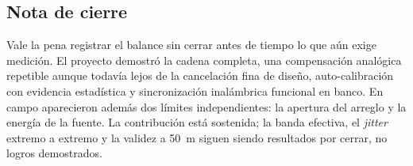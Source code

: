\subsection{Nota de cierre}

Vale la pena registrar el balance sin cerrar antes de tiempo lo que a\'un exige
medici\'on. El proyecto demostr\'o la cadena completa, una compensaci\'on
anal\'ogica repetible aunque todav\'ia lejos de la cancelaci\'on fina de dise\~no,
auto-calibraci\'on con evidencia estad\'istica y sincronizaci\'on inal\'ambrica
funcional en banco. En campo aparecieron adem\'as dos l\'imites independientes:
la apertura del arreglo y la energ\'ia de la fuente. La contribuci\'on est\'a
sostenida; la banda efectiva, el \emph{jitter} extremo a extremo y la validez a
\SI{50}{\meter} siguen siendo resultados por cerrar, no logros demostrados.
